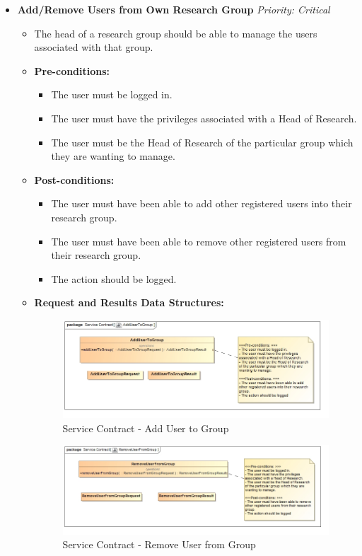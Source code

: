 \documentclass{article}
\begin{document}
				\begin{itemize}
					\item \textbf{Add/Remove Users from Own Research Group} \hfill \textit{Priority: Critical}
					\begin{itemize}
						\item The head of a research group should be able to manage the users associated with that group.
						\item \textbf{Pre-conditions:}
						\begin{itemize}
							\item The user must be logged in.
							\item The user must have the privileges associated with a Head of Research.
							\item The user must be the Head of Research of the particular group which they are wanting to manage.
						\end{itemize}
						\item \textbf{Post-conditions:}
						\begin{itemize}
							\item The user must have been able to add other registered users into their research group.
							\item The user must have been able to remove other registered users from their research group.
							\item The action should be logged.
						\end{itemize}
						\item \textbf{Request and Results Data Structures:}
						\begin{figure}[H]
							\includegraphics[width=\linewidth]{../Diagrams/ServiceContracts/AddUserToGroup.jpg}
							\caption{Service Contract - Add User to Group}
						\end{figure}
						\begin{figure}[H]
							\includegraphics[width=\linewidth]{../Diagrams/ServiceContracts/RemoveUserFromGroup.jpg}
							\caption{Service Contract - Remove User from Group}
						\end{figure}
					\end{itemize}
					

\end{itemize}
\end{document}
